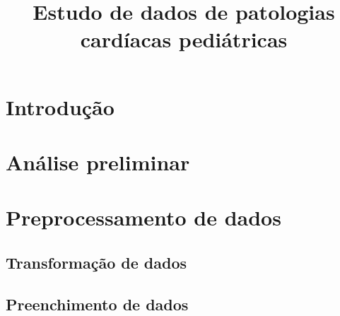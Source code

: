 \documentclass[10pt, conference, compsocconf]{IEEEtran}
\begin{document}
\title{Estudo de dados de patologias cardíacas pediátricas}

\author{
  \and
}

\maketitle


\section{Introdução}
\lipsum[1]

\lipsum[2]

\lipsum[3]


\section{Análise preliminar}

\lipsum[1]

\lipsum[2]


\section{Preprocessamento de dados}

\lipsum[1]


\subsection{Transformação de dados}

\lipsum[2]


\subsection{Preenchimento de dados}
\end{document}

